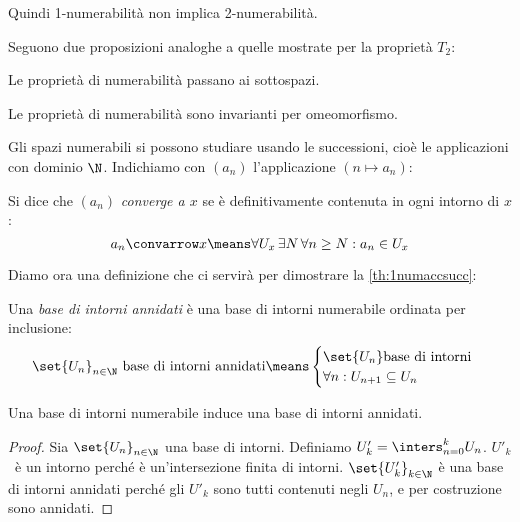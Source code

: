 \begin{oss}
	Quindi 1-numerabilità non implica 2-numerabilità.
\end{oss}

Seguono due proposizioni analoghe a quelle mostrate per la proprietà $T_2$:

\begin{prop}
	Le proprietà di numerabilità passano ai sottospazi.
\end{prop}

\begin{prop}
	Le proprietà di numerabilità sono invarianti per omeomorfismo.
\end{prop}

Gli spazi numerabili si possono studiare usando le successioni, cioè le applicazioni con dominio $\N$.
Indichiamo con $(a_n)$ l'applicazione $(n\mapsto a_n)$:

\begin{defn}[Convergenza]
	Si dice che $(a_n)$ \emph{converge a $x$} se è definitivamente contenuta in ogni intorno di $x$:
	\[a_n\convarrow x\means
	\forall U_x\,\exists N\,\forall n\geq N:a_n\in U_x\]
\end{defn}

Diamo ora una definizione che ci servirà per dimostrare la \autoref{th:1numaccsucc}:

\begin{defn}
	Una \emph{base di intorni annidati} è una base di intorni numerabile ordinata per inclusione:
	\[\set{U_n}_{n\in\N}\text{ base di intorni annidati}\means
	\begin{cases}
		\set{U_n}\text{base di intorni}\\
		\forall n:U_{n+1}\subseteq U_n
	\end{cases}\]
\end{defn}

\begin{prop}
	Una base di intorni numerabile induce una base di intorni annidati.
\end{prop}

\begin{proof}
	Sia $\set{U_n}_{n\in\N}$ una base di intorni.
	Definiamo $U'_k=\inters_{n=0}^kU_n$.
	$U'_k$~è un intorno perché è un'intersezione finita di intorni.
	$\set{U'_k}_{k\in\N}$ è una base di intorni annidati perché gli $U'_k$ sono tutti contenuti negli $U_n$, e per costruzione sono annidati.
\end{proof}

